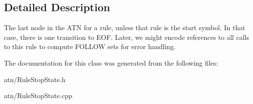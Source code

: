 \subsection{Detailed Description}
The last node in the A\+TN for a rule, unless that rule is the start symbol. In that case, there is one transition to E\+OF. Later, we might encode references to all calls to this rule to compute F\+O\+L\+L\+OW sets for error handling. 

The documentation for this class was generated from the following files\+:\begin{DoxyCompactItemize}
\item 
atn/Rule\+Stop\+State.\+h\item 
atn/Rule\+Stop\+State.\+cpp\end{DoxyCompactItemize}
